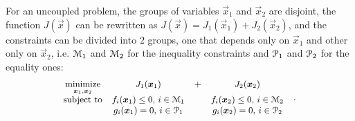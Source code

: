 \documentclass[../main.tex]{subfiles}
\begin{document}
 For an uncoupled problem, the groups of variables $\vec{x}_{1}$ and $\vec{x}_{2}$ are disjoint, the function $J(\vec{x})$ can be rewritten  as $J(\vec{x})=J_{1}(\vec{x}_{1})+J_{2}(\vec{x}_{2})$, and the constraints can be divided into $2$ groups, one that depends only on $\vec{x}_{1}$ and other only on $\vec{x}_{2}$, i.e. $\mathcal{M}_{1}$ and $\mathcal{M}_{2}$ for the inequality constraints and $\mathcal{P}_{1}$ and $\mathcal{P}_{2}$ for the equality ones:
\begin{equation}\label{eq:general_uncoupled_optimization_problem}
  \small
  \begin{aligned}
    \begin{matrix}
      \underset{\boldsymbol{x}_{1},\boldsymbol{x}_{2}}{\mathrm{minimize}}  &J_{1}(\boldsymbol{x}_{1})&+&J_{2}(\boldsymbol{x}_{2})&\\
      \mathrm{subject~ to} &

           f_{i}(\boldsymbol{x}_{1}) \leq 0 \text{, } i\in\mathcal{M}_{1}& & f_{i}(\boldsymbol{x}_{2}) \leq 0 \text{, } i\in\mathcal{M}_{2}\\
          & g_{i}(\boldsymbol{x}_{1}) = 0\text{, } i\in\mathcal{P}_{1}& & g_{i}(\boldsymbol{x}_{2}) = 0\text{, } i\in\mathcal{P}_{2}\\
    \end{matrix}
  \end{aligned}.
\end{equation}
\end{document}
